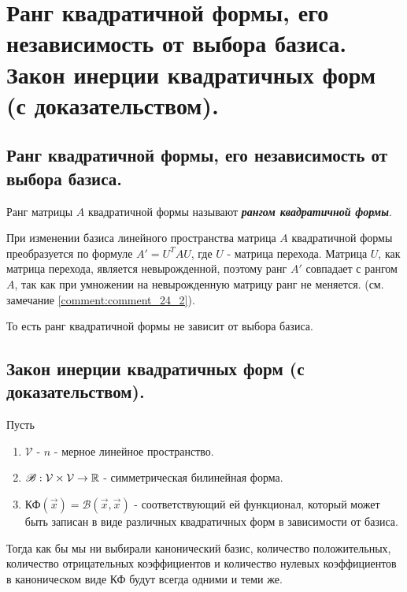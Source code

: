 \section{
    Ранг квадратичной формы, его независимость от выбора базиса. Закон инерции квадратичных форм (с доказательством). 
}

\subsection{
    Ранг квадратичной формы, его независимость от выбора базиса.
}

\begin{definition}
    Ранг матрицы $A$ квадратичной формы называют \textbf{\textit{рангом квадратичной формы}}.
\end{definition}

При изменении базиса линейного пространства матрица $A$ квадратичной формы преобразуется по формуле $A' = U^TAU$, где $U$ - матрица перехода. Матрица $U$, как матрица перехода, является невырожденной, поэтому ранг $A'$ совпадает с рангом $A$, так как при умножении на невырожденную матрицу ранг не меняется. (см. замечание \ref{comment:comment_24_2}). 

То есть ранг квадратичной формы не зависит от выбора базиса.

\newpage


\subsection{
    Закон инерции квадратичных форм (с доказательством).
}

\begin{theorem} Пусть
    \begin{enumerate}
        \item $\mathcal{V}$ - $n$ - мерное линейное пространство.
        \item $\mathscr{B}: \mathcal{V} \times \mathcal{V} \to \mathbb{R}$ - симметрическая билинейная форма.
        \item $\text{КФ}(\vec{x}) = \mathscr{B}(\vec{x}, \vec{x})$ - соответствующий ей функционал, который может быть записан в виде различных квадратичных форм в зависимости от базиса.
    \end{enumerate}

    Тогда как бы мы ни выбирали канонический базис, количество положительных, количество отрицательных коэффициентов и количество нулевых коэффициентов в каноническом виде КФ будут всегда одними и теми же.
\end{theorem}


